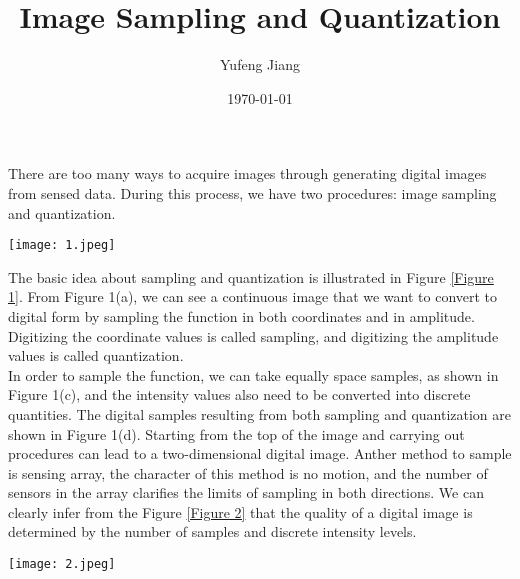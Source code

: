 \documentclass[11pt,oneside]{article}
\title{Image Sampling and Quantization}
\author{Yufeng Jiang}
\date{\today}
\begin{document}
\maketitle
There are too many ways to acquire images through generating digital images from sensed data. During this process, we have two procedures: image sampling and quantization.\\
\begin{figure*}[htbp]
\centering
\texttt{[image: 1.jpeg]}
\caption{Generating a digital image. (a) Continuous image. (b) A scan line from A to B in the continuous image, used to illustrate the concepts of sampling and quantization. (c)Sampling and quantization. (d) Digital scan line.}
\label{Figure 1}
\end{figure*}
\indent The basic idea about sampling and quantization is illustrated in Figure \ref{Figure 1}. 
From Figure 1(a), we can see a continuous image that we want to convert to digital form by sampling the function in both coordinates and in amplitude. Digitizing the coordinate values is called sampling, and digitizing the amplitude values is called quantization. \\
\indent In order to sample the function, we can take equally space samples, as shown in Figure 1(c), and the intensity values also need to be converted into discrete quantities. The digital samples resulting from both sampling and quantization are shown in Figure 1(d). Starting from the top of the image and carrying out procedures can lead to a two-dimensional digital image. Anther method to sample is sensing array, the character of this method is no motion, and the number of sensors in the array clarifies the limits of sampling in both directions. We can clearly infer from the Figure \ref{Figure 2} that the quality of a digital image is determined by the number of samples and discrete intensity levels. 
\begin{figure*}[htbp]
\centering
\texttt{[image: 2.jpeg]}
\caption{(a) Continuous image projected onto a sensor array. (b) Result of image sampling and quantization.}
\label{Figure 2}
\end{figure*}
\end{document}

